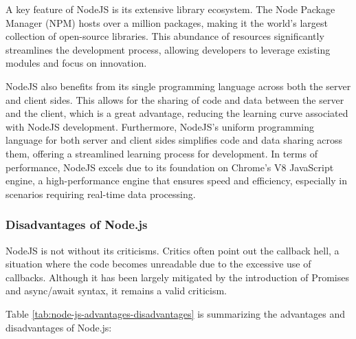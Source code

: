 A key feature of NodeJS is its extensive library ecosystem. The Node Package Manager (NPM) hosts over a million packages, making it the world's largest collection of open-source libraries.\cite{npm} 
This abundance of resources significantly streamlines the development process, allowing developers to leverage existing modules and focus on innovation.

NodeJS also benefits from its single programming language across both the server and client sides. This allows for the sharing of code and data between the server and the client, which is a great advantage, reducing the learning curve associated with NodeJS development. \cite{tilkov}
Furthermore, NodeJS's uniform programming language for both server and client sides simplifies code and data sharing across them, offering a streamlined learning process for development. In terms of performance, NodeJS excels due to its foundation on Chrome's V8 JavaScript engine, a high-performance engine that ensures speed and efficiency, especially in scenarios requiring real-time data processing. \cite{tilkov}

\subsubsection*{Disadvantages of Node.js}
NodeJS is not without its criticisms. Critics often point out the callback hell, a situation where the code becomes unreadable due to the excessive use of callbacks. Although it has been largely mitigated by the introduction of Promises and async/await syntax, it remains a valid criticism. \cite{cantelon2014node}

Table \ref{tab:node-js-advantages-disadvantages} is summarizing the advantages and disadvantages of Node.js\cite{tilkov}:

